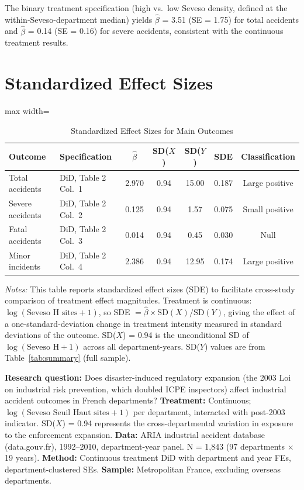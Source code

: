 \documentclass[12pt]{article}
\begin{document}
The binary treatment specification (high vs.\ low Seveso density, defined at the within-Seveso-department median) yields $\hat{\beta}$ = 3.51 (SE = 1.75) for total accidents and $\hat{\beta}$ = 0.14 (SE = 0.16) for severe accidents, consistent with the continuous treatment results.


\section{Standardized Effect Sizes}
\label{sec:sde}

\begin{table}[H]
\centering
\caption{Standardized Effect Sizes for Main Outcomes}
\label{tab:sde}
\begin{adjustbox}{max width=\textwidth}
\begin{tabular}{llccccc}
\toprule
Outcome & Specification & $\hat{\beta}$ & SD($X$) & SD($Y$) & SDE & Classification \\
\midrule
Total accidents & DiD, Table 2 Col.\ 1 & 2.970 & 0.94 & 15.00 & 0.187 & Large positive \\
Severe accidents & DiD, Table 2 Col.\ 2 & 0.125 & 0.94 & 1.57 & 0.075 & Small positive \\
Fatal accidents & DiD, Table 2 Col.\ 3 & 0.014 & 0.94 & 0.45 & 0.030 & Null \\
Minor incidents & DiD, Table 2 Col.\ 4 & 2.386 & 0.94 & 12.95 & 0.174 & Large positive \\
\bottomrule
\end{tabular}
\end{adjustbox}
\par\vspace{0.3em}
{\footnotesize \textit{Notes:} This table reports standardized effect sizes (SDE) to facilitate cross-study comparison of treatment effect magnitudes. Treatment is continuous: $\log(\text{Seveso H sites} + 1)$, so SDE $= \hat{\beta} \times \text{SD}(X) / \text{SD}(Y)$, giving the effect of a one-standard-deviation change in treatment intensity measured in standard deviations of the outcome. SD($X$) = 0.94 is the unconditional SD of $\log(\text{Seveso H} + 1)$ across all department-years. SD($Y$) values are from Table~\ref{tab:summary} (full sample).

\textbf{Research question:} Does disaster-induced regulatory expansion (the 2003 Loi on industrial risk prevention, which doubled ICPE inspectors) affect industrial accident outcomes in French departments?
\textbf{Treatment:} Continuous; $\log(\text{Seveso Seuil Haut sites} + 1)$ per department, interacted with post-2003 indicator. SD($X$) = 0.94 represents the cross-departmental variation in exposure to the enforcement expansion.
\textbf{Data:} ARIA industrial accident database (data.gouv.fr), 1992--2010, department-year panel. N = 1,843 (97 departments $\times$ 19 years).
\textbf{Method:} Continuous treatment DiD with department and year FEs, department-clustered SEs.
\textbf{Sample:} Metropolitan France, excluding overseas departments.

}
\end{table}
\end{document}
